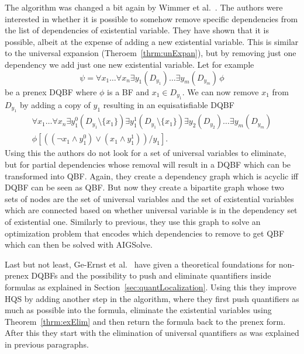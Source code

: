 \documentclass[
  digital, %
  twoside, %
  table,   %
  nolof,     %
  nolot,     %
]{fithesis3}
\theoremstyle{definition}
\theoremstyle{remark}
\newcommand{\itholds}{\,}
\begin{document}
The algorithm was changed a bit again by Wimmer et al.~\cite{HQSdependencyElimination}. The authors were interested in whether it is possible to somehow remove specific dependencies from the list of dependencies of existential variable. They have shown that it is possible, albeit at the expense of adding a new existential variable. This is similar to the universal expansion (Theroem~\ref{thrm:unExpan}), but by removing just one dependency we add just one new existential variable. Let for example
\[\psi = \forall x_1 \dots \forall x_n \exists y_1(D_{y_1}) \dots \exists y_m(D_{y_m}) \itholds \phi\]
be a prenex DQBF where $\phi$ is a BF and $x_1 \in D_{y_1}$. We can now remove $x_1$ from $D_{y_1}$ by adding a copy of $y_1$ resulting in an equisatisfiable DQBF
\begin{multline*}
\forall x_1 \dots \forall x_n \exists y_1^0(D_{y_1} \setminus \{x_1\}) \exists y_1^1(D_{y_1} \setminus \{x_1\}) \exists y_2(D_{y_2})\dots \exists y_m(D_{y_m}) \\
\phi\left[((\neg x_1 \land y_1^0) \lor (x_1 \land y_1^1))/y_1\right].
\end{multline*}
Using this the authors do not look for a set of universal variables to eliminate, but for partial dependencies whose removal will result in a DQBF which can be transformed into QBF. Again, they create a dependency graph which is acyclic iff DQBF can be seen as QBF. But now they create a bipartite graph whose two sets of nodes are the set of universal variables and the set of existential variables which are connected based on whether universal variable is in the dependency set of existential one. Similarly to previous, they use this graph to solve an optimization problem that encodes which dependencies to remove to get QBF which can then be solved with AIGSolve.

Last but not least, Ge-Ernst et al.~\cite{HQSquantifierLocalization} have given a theoretical foundations for non-prenex DQBFs and the possibility to push and eliminate quantifiers inside formulas as explained in Section~\ref{sec:quantLocalization}. Using this they improve HQS by adding another step in the algorithm, where they first push quantifiers as much as possible into the formula, eliminate the existential variables using Theorem~\ref{thrm:exElim} and then return the formula back to the prenex form. After this they start with the elimination of universal quantifiers as was explained in previous paragraphs.
\end{document}
